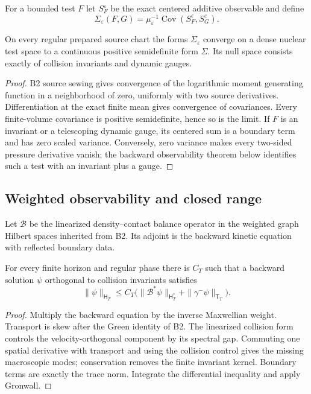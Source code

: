 For a bounded test $F$ let $S_F^\varepsilon$ be the exact centered additive
observable and define
\[
 \Sigma_\varepsilon(F,G)=\mu_\varepsilon^{-1}
 \operatorname{Cov}(S_F^\varepsilon,S_G^\varepsilon).
\]

\begin{theorem}
\label{thm:r8-b3-cumulant}
On every regular prepared source chart the forms $\Sigma_\varepsilon$ converge
on a dense nuclear test space to a continuous positive semidefinite form
$\Sigma$.  Its null space consists exactly of collision invariants and dynamic
gauges.
\end{theorem}

\begin{proof}
B2 source sewing gives convergence of the logarithmic moment generating
function in a neighborhood of zero, uniformly with two source derivatives.
Differentiation at the exact finite mean gives convergence of covariances.
Every finite-volume covariance is positive semidefinite, hence so is the
limit.  If $F$ is an invariant or a telescoping dynamic gauge, its centered
sum is a boundary term and has zero scaled variance.  Conversely, zero
variance makes every two-sided pressure derivative vanish; the backward
observability theorem below identifies such a test with an invariant plus a
gauge.
\end{proof}

\subsection{Weighted observability and closed range}

Let $\mathcal B$ be the linearized density--contact balance operator in the
weighted graph Hilbert spaces inherited from B2.  Its adjoint is the backward
kinetic equation with reflected boundary data.

\begin{lemma}
\label{lem:r8-b3-observability}
For every finite horizon and regular phase there is $C_T$ such that a backward
solution $\psi$ orthogonal to collision invariants satisfies
\[
 \|\psi\|_{\mathsf H_T}
 \le C_T\bigl(\|\mathcal B^*\psi\|_{\mathsf H_T^*}
 +\|\gamma^-\psi\|_{\mathsf T_T}\bigr).
\]
\end{lemma}

\begin{proof}
Multiply the backward equation by the inverse Maxwellian weight.  Transport is
skew after the Green identity of B2.  The linearized collision form controls
the velocity-orthogonal component by its spectral gap.  Commuting one spatial
derivative with transport and using the collision control gives the missing
macroscopic modes; conservation removes the finite invariant kernel.  Boundary
terms are exactly the trace norm.  Integrate the differential inequality and
apply Gronwall.
\end{proof}

